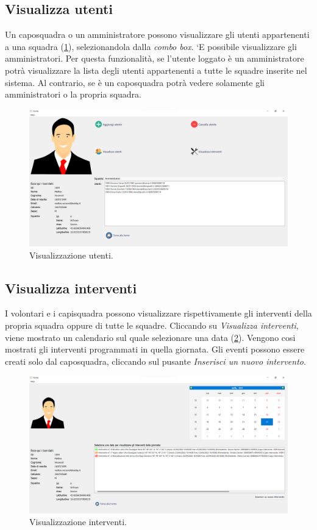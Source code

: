 \subsection{Visualizza utenti}
Un caposquadra o un amministratore possono visualizzare gli utenti appartenenti a una squadra (\Fig\ref{fig:view_user}), selezionandola dalla \textit{combo box}. `E possibile visualizzare gli amministratori. Per questa funzionalità, se l'utente loggato è un amministratore potrà visualizzare la lista degli utenti appartenenti a tutte le squadre inserite nel sistema. Al contrario, se è un caposquadra potrà vedere solamente gli amministratori o la propria squadra.

\begin{figure}[h!]
	\centering
	\includegraphics[width=1\linewidth]{./ImageFiles/view_user}
	\caption{Visualizzazione utenti.}
	\label{fig:view_user}
\end{figure}

\subsection{Visualizza interventi}
I volontari e i capisquadra possono visualizzare rispettivamente gli interventi della propria squadra oppure di tutte le squadre. Cliccando su \textit{Visualizza interventi}, viene mostrato un calendario sul quale selezionare una data (\Fig\ref{fig:view_operation}). Vengono cosi mostrati gli interventi programmati in quella giornata. Gli eventi possono essere creati solo dal caposquadra, cliccando sul pusante \textit{Inserisci un nuovo intervento}.
\begin{figure}[h!]
	\centering
	\includegraphics[width=1\linewidth]{./ImageFiles/view_operation.png}
	\caption{Visualizzazione interventi.}
	\label{fig:view_operation}
\end{figure}


